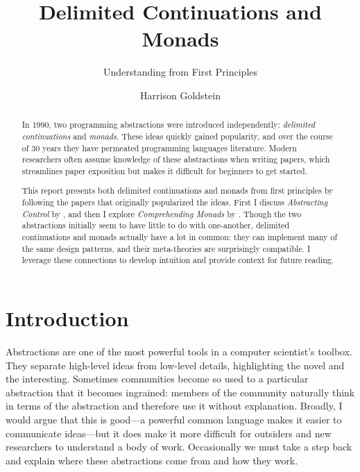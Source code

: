 \documentclass[acmsmall, nonacm, screen]{acmart}
\begin{document}
\title{Delimited Continuations and Monads}
\subtitle{Understanding from First Principles}

\author{Harrison Goldstein}

\renewcommand{\shortauthors}{Goldstein}

\begin{abstract}
  In 1990, two programming abstractions were introduced independently: {\em delimited
  continuations} and {\em monads}. These ideas quickly gained popularity, and over the course of
  30 years they have permeated programming languages literature. Modern researchers often assume
  knowledge of these abstractions when writing papers, which streamlines paper exposition but
  makes it difficult for beginners to get started.
  
  This report presents both delimited continuations and monads from first principles by following
  the papers that originally popularized the ideas. First I discuss {\em Abstracting Control} by
  \citet{danvy1990abstracting}, and then I explore {\em Comprehending Monads} by
  \citet{wadler1990comprehending}. Though the two abstractions initially seem to have little to
  do with one-another, delimited continuations and monads actually have a lot in common: they can
  implement many of the same design patterns, and their meta-theories are surprisingly
  compatible. I leverage these connections to develop intuition and provide context for future
  reading.
\end{abstract}

\maketitle

\section{Introduction} \label{sec:introduction}
Abstractions are one of the most powerful tools in a computer scientist's toolbox. They separate
high-level ideas from low-level details, highlighting the novel and the interesting. Sometimes
communities become so used to a particular abstraction that it becomes ingrained: members of the
community naturally think in terms of the abstraction and therefore use it without explanation.
Broadly, I would argue that this is good---a powerful common language makes it easier to
communicate ideas---but it does make it more difficult for outsiders and new researchers to
understand a body of work. Occasionally we must take a step back and explain where these
abstractions come from and how they work.
\end{document}
